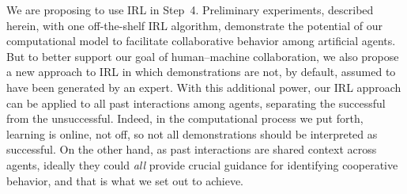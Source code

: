 We are proposing to use IRL in Step~4.  Preliminary experiments,
described herein, with one off-the-shelf IRL algorithm, demonstrate
the potential of our computational model to facilitate collaborative
behavior among artificial agents.
%
But to better support our goal of human--machine collaboration, we
also propose a new approach to IRL in which demonstrations are not, by
default, assumed to have been generated by an expert.
%
With this additional power, our IRL approach can be applied to all
past interactions among agents, separating the successful from the
unsuccessful.
%
%
Indeed, in the computational process we put forth, learning is online,
not off, so not all demonstrations should be interpreted as
successful.  On the other hand, as past interactions are shared
context across agents, ideally they could \emph{all\/} provide crucial
guidance for identifying cooperative behavior, and that is what we set
out to achieve.

